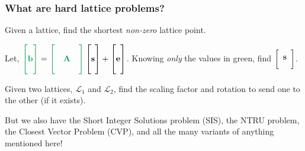\documentclass[
aspectratio=169, %
t, %
onlytextwidth, %
10pt, %
]{beamer}
\begin{document}

\begin{frame}
    \frametitle{What are hard lattice problems?}

    \begin{adjustwidth}{0cm}{0cm} %

        \begin{tcolorbox}[colback=ICLBlue!5!white,colframe=ICLBlue,title=\textbf{Definition:} Shortest Vector Problem (SVP)]
            Given a lattice, find the shortest \textit{non-zero} lattice point.
        \end{tcolorbox}

        \begin{tcolorbox}[colback=ICLBlue!5!white,colframe=ICLBlue,title=\textbf{Definition:} Learning With Errors Problem (LWE)]
            Let, $\color{ForestGreen} \begin{bmatrix} \\ \mathbf{b} \\ \\ \end{bmatrix} \color{black} = \color{ForestGreen} \begin{bmatrix} & & \\ & \mathbf{A} & \\ & & \end{bmatrix} \color{black} \begin{bmatrix} \\ \mathbf{s} \\ \\ \end{bmatrix} + \begin{bmatrix} \\ \mathbf{e} \\ \\ \end{bmatrix}$.
            Knowing \textit{only} the values in \color{ForestGreen} green\color{black}, find $\begin{bmatrix} \\ \mathbf{s} \\ \\ \end{bmatrix}$.
        \end{tcolorbox}
        \begin{tcolorbox}[colback=ICLBlue!5!white,colframe=ICLBlue,title=\textbf{Definition:} Lattice Isomorphism Problem (LIP)]
            Given two lattices, $\mathcal{L}_1$ and $\mathcal{L}_2$, find the scaling factor and rotation to send one to the other (if it exists).
        \end{tcolorbox}

        But we also have the Short Integer Solutions problem (SIS), the NTRU problem, the Closest Vector Problem (CVP), and all the many variants of anything mentioned here!

    \end{adjustwidth}
\end{frame}
\end{document}
